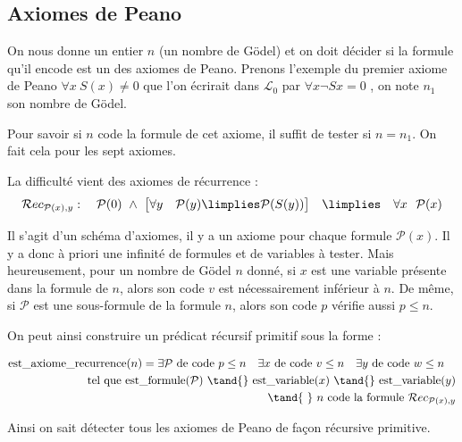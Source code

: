 \documentclass[11pt,class=report,crop=false]{standalone}
\begin{document}
\subsection{Axiomes de Peano}

On nous donne un entier $n$ (un nombre de Gödel) et on doit décider si la formule qu'il encode est un des axiomes de Peano.
Prenons l'exemple du premier axiome de Peano \og{}$\forall x \ S(x) \neq 0$\fg{} 
que l'on écrirait dans $\mathcal{L}_0$ par \og{}$\forall x \lnot S x = 0$ \fg{}, on note $n_1$ son nombre de Gödel.

Pour savoir si $n$ code la formule de cet axiome, il suffit de tester si $n=n_1$. On fait cela pour les sept axiomes.

La difficulté vient des axiomes de récurrence :
\[
\mathcal{R}ec_{\mathcal{P}(x),y} : \quad \mathcal{P}(0) \ \land \ \big[\forall y \quad \mathcal{P}(y) \limplies \mathcal{P}(S(y))\big] \quad \limplies \quad \forall x \ \ \mathcal{P}(x) 
\]

Il s'agit d'un schéma d'axiomes, il y a un axiome pour chaque formule $\mathcal{P}(x)$.
Il y a donc à priori une infinité de formules et de variables à tester.
Mais heureusement, pour un nombre de Gödel $n$ donné, si $x$ est une variable présente dans la formule de $n$, alors son code $v$ est nécessairement inférieur à $n$. De même, si $\mathcal{P}$ est une sous-formule de la formule $n$, alors son code $p$ vérifie aussi $p \le n$.

On peut ainsi construire un prédicat récursif primitif sous la forme :

\begin{equation*}
\begin{split}
\text{est\_axiome\_recurrence}(n) = 
\exists \mathcal{P} \text{ de code } p \le n \quad 
\exists x \text{ de code } v \le n \quad
\exists  y \text{ de code } w \le n \quad \\
\text{ tel que } \text{est\_formule}(\mathcal{P}) \text{ \tand{} } \text{est\_variable}(x) \text{ \tand{} } \text{est\_variable}(y) \\
\text{ \tand{   } } n \text{ code la formule } \mathcal{R}ec_{\mathcal{P}(x),y}
\end{split}
\end{equation*}

Ainsi on sait détecter tous les axiomes de Peano de façon récursive primitive.

\end{document}
